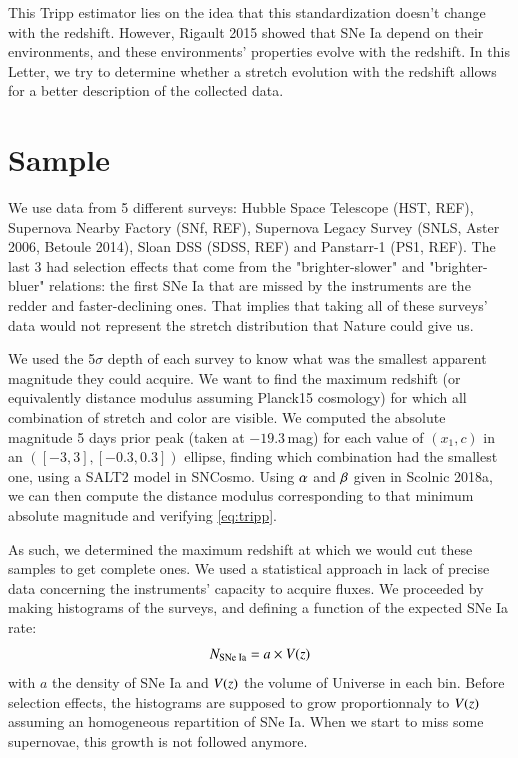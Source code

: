 \documentclass{aa}
\begin{document}
This Tripp estimator lies on the idea that this standardization doesn't change
with the redshift. However, Rigault 2015 showed that SNe Ia depend on their
environments, and these environments' properties evolve with the redshift. In
this Letter, we try to determine whether a stretch evolution with the redshift
allows for a better description of the collected data.

\section{Sample}\label{sec:sam}

We use data from 5 different surveys: Hubble Space Telescope (HST, REF),
Supernova Nearby Factory (SNf, REF), Supernova Legacy Survey (SNLS, Aster 2006,
Betoule 2014), Sloan DSS (SDSS, REF) and Panstarr-1 (PS1, REF). The last 3 had
selection effects that come from the "brighter-slower" and "brighter-bluer"
relations: the first SNe Ia that are missed by the instruments are the redder
and faster-declining ones. That implies that taking all of these surveys' data
would not represent the stretch distribution that Nature could give us.

We used the 5$\sigma$ depth of each survey to know what was the smallest
apparent magnitude they could acquire. We want to find the maximum redshift
(or equivalently distance modulus assuming Planck15 cosmology) for which all
combination of stretch and color are visible. We computed the absolute magnitude
5 days prior peak (taken at $-19.3\,$mag) for each value of
$(x_1, c)$ in an $([-3, 3], [-0.3, 0.3])$ ellipse, finding which combination had
the smallest one, using a SALT2 model in SNCosmo. Using $\alpha$ and $\beta$ given in
Scolnic 2018a, we can then compute the distance modulus corresponding to that
minimum absolute magnitude and verifying \eqref{eq:tripp}.

As such, we determined the maximum redshift at which we would cut these samples
to get complete ones. We used a statistical approach in lack of precise data
concerning the instruments' capacity to acquire fluxes. We proceeded by making
histograms of the surveys, and defining a function of the expected SNe Ia rate:
\begin{equation}
    N_{\text{SNe Ia}} = a \times V(z)
\end{equation}
with $a$ the density of SNe Ia and $V(z)$ the volume of Universe in each bin.
Before selection effects, the histograms are supposed to grow proportionnaly to
$V(z)$ assuming an homogeneous repartition of SNe Ia. When we start to miss some
supernovae, this growth is not followed anymore.
\end{document}
